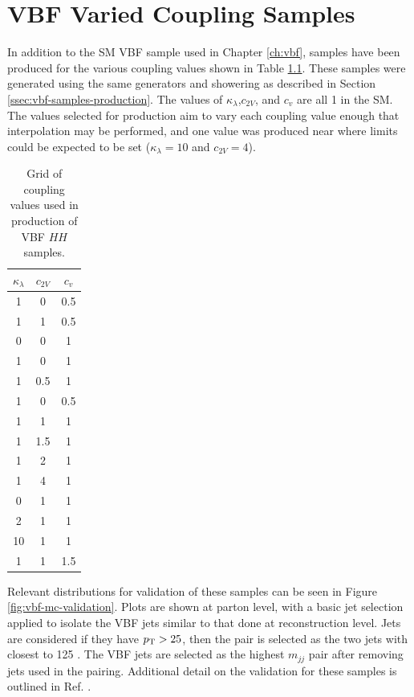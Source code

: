 \chapter{VBF Varied Coupling Samples} \label{app:vbf-couplings}

In addition to the \gls{SM} VBF \hh sample used in Chapter \ref{ch:vbf}, samples have been produced for the various coupling values shown in Table \ref{tab:vbf-coupling-samples}. These samples were generated using the same generators and showering as described in Section \ref{ssec:vbf-samples-production}. The values of $\kappa_\lambda$,$c_{2V}$, and $c_{v}$ are all 1 in the SM. The values selected for production aim to vary each coupling value enough that interpolation may be performed, and one value was produced near where limits could be expected to be set ($\kappa_\lambda = 10$ and $c_{2V}=4$).

\begin{table}[htbp]
    \centering
    \caption{Grid of coupling values used in production of VBF $HH$ samples.}
    \begin{tabular}{c|c|c}
        $\kappa_\lambda$ & $c_{2V}$ & $c_{v}$ \\
        \hline
        1 & 0 & 0.5 \\
        1 & 1 & 0.5 \\
        0 & 0 & 1 \\
        1 & 0 & 1 \\
        1 & 0.5 & 1 \\
        1 & 0 & 0.5 \\
        1 & 1 & 1 \\
        1 & 1.5 & 1 \\
        1 & 2 & 1 \\
        1 & 4 & 1 \\
        0 & 1 & 1 \\
        2 & 1 & 1 \\
        10 & 1 & 1 \\
        1 & 1 & 1.5
    \end{tabular}
    \label{tab:vbf-coupling-samples}
\end{table}

Relevant distributions for validation of these samples can be seen in Figure \ref{fig:vbf-mc-validation}. Plots are shown at parton level, with a basic jet selection applied to isolate the VBF jets similar to that done at reconstruction level. Jets are considered if they have $p_{\text{T}} > 25$, then the \mbb pair is selected as the two jets with \mbb closest to 125 \GeV. The VBF jets are selected as the highest $m_{jj}$ pair after removing jets used in the \mbb pairing. Additional detail on the validation for these samples is outlined in Ref. \cite{mc-validation}.


